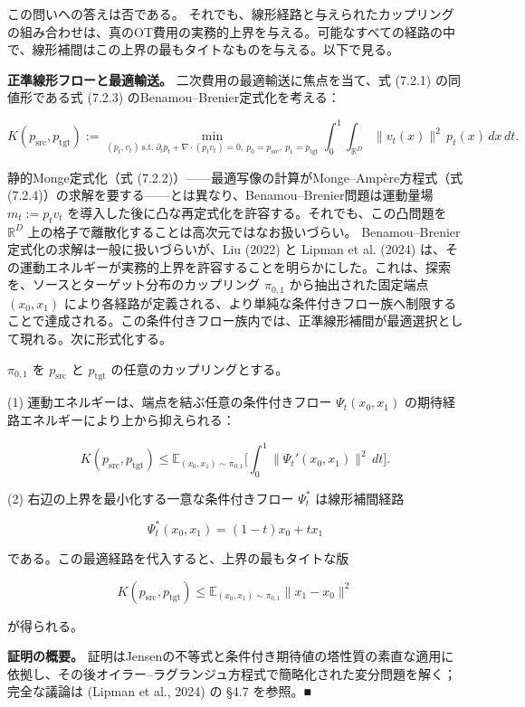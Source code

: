 この問いへの答えは否である。
それでも、線形経路と与えられたカップリングの組み合わせは、真のOT費用の実務的上界を与える。可能なすべての経路の中で、線形補間はこの上界の最もタイトなものを与える。以下で見る。

\textbf{正準線形フローと最適輸送。} 二次費用の最適輸送に焦点を当て、式 (7.2.1) の同値形である式 (7.2.3) のBenamou–Brenier定式化を考える：

\[
K(p_{\mathrm{src}},p_{\mathrm{tgt}}):=\min_{(p_t,v_t)\ \mathrm{s.t.}\ \partial_t p_t+\nabla\cdot(p_t v_t)=0,\ p_0=p_{\mathrm{src}},\ p_1=p_{\mathrm{tgt}}}\int_0^1\int_{\mathbb{R}^D}\|v_t(x)\|^2\,p_t(x)\,dx\,dt.
\]


静的Monge定式化（式 (7.2.2)）——最適写像の計算がMonge–Ampère方程式（式 (7.2.4)）の求解を要する——とは異なり、Benamou–Brenier問題は運動量場 $m_t:=p_t v_t$ を導入した後に凸な再定式化を許容する。それでも、この凸問題を $\mathbb{R}^D$ 上の格子で離散化することは高次元ではなお扱いづらい。
Benamou–Brenier定式化の求解は一般に扱いづらいが、Liu (2022) と Lipman et al. (2024) は、その運動エネルギーが実務的上界を許容することを明らかにした。これは、探索を、ソースとターゲット分布のカップリング $\pi_{0,1}$ から抽出された固定端点 $(x_0,x_1)$ により各経路が定義される、より単純な条件付きフロー族へ制限することで達成される。この条件付きフロー族内では、正準線形補間が最適選択として現れる。次に形式化する。

\begin{propositionbox}[命題 7.5.1（条件付きフローによるOT運動エネルギーの上界）]
$\pi_{0,1}$ を $p_{\mathrm{src}}$ と $p_{\mathrm{tgt}}$ の任意のカップリングとする。

(1) 運動エネルギーは、端点を結ぶ任意の条件付きフロー $\Psi_t(x_0,x_1)$ の期待経路エネルギーにより上から抑えられる：

\[
K(p_{\mathrm{src}},p_{\mathrm{tgt}})\le\mathbb{E}_{(x_0,x_1)\sim\pi_{0,1}}\Biggl[\int_0^1\|\Psi_t'(x_0,x_1)\|^2\,dt\Biggr].
\]

(2) 右辺の上界を最小化する一意な条件付きフロー $\Psi_t^*$ は線形補間経路

\[
\Psi_t^*(x_0,x_1)=(1-t)x_0+t x_1
\]

である。この最適経路を代入すると、上界の最もタイトな版

\[
K(p_{\mathrm{src}},p_{\mathrm{tgt}})\le\mathbb{E}_{(x_0,x_1)\sim\pi_{0,1}}\|x_1-x_0\|^2
\]

が得られる。
\end{propositionbox}


\textbf{証明の概要。} 証明はJensenの不等式と条件付き期待値の塔性質の素直な適用に依拠し、その後オイラー–ラグランジュ方程式で簡略化された変分問題を解く；完全な議論は (Lipman et al., 2024) の §4.7 を参照。■

